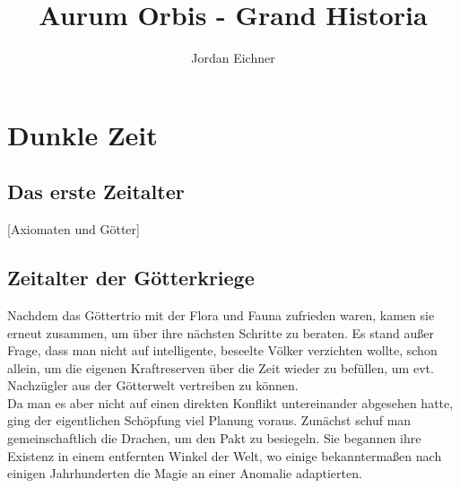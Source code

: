 \documentclass[a4paper,12pt,oneside]{book}
\title{Aurum Orbis - Grand Historia}
\author{Jordan Eichner}
\date{}
\begin{document}
\maketitle
\tableofcontents
\part{Dunkle Zeit}
\chapter{Das erste Zeitalter}
[Axiomaten und Götter]
\chapter{Zeitalter der Götterkriege}
Nachdem das Göttertrio mit der Flora und Fauna zufrieden waren, kamen sie erneut zusammen, um über ihre nächsten Schritte zu beraten. Es stand außer Frage, dass man nicht auf intelligente, beseelte Völker verzichten wollte, schon allein, um die eigenen Kraftreserven über die Zeit wieder zu befüllen, um evt. Nachzügler aus der Götterwelt vertreiben zu können. 
\\Da man es aber nicht auf einen direkten Konflikt untereinander abgesehen hatte, ging der eigentlichen Schöpfung viel Planung voraus. Zunächst schuf man gemeinschaftlich die Drachen, um den Pakt zu besiegeln. Sie begannen ihre Existenz in einem entfernten Winkel der Welt, wo einige bekanntermaßen nach einigen Jahrhunderten die Magie an einer Anomalie adaptierten.
\end{document}
